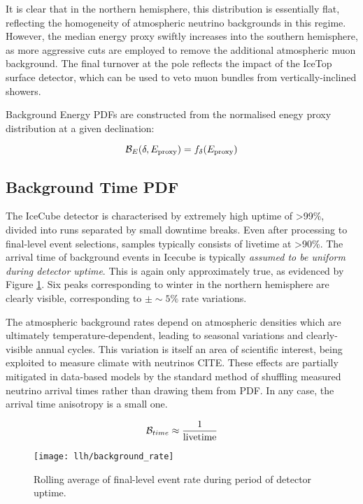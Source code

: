 It is clear that in the northern hemisphere, this distribution is essentially flat, reflecting the homogeneity of atmospheric neutrino backgrounds in this regime. However, the median energy proxy swiftly increases into the southern hemisphere, as more aggressive cuts are employed to remove the additional atmospheric muon background. The final turnover at the pole reflects the impact of the IceTop surface detector, which can be used to veto muon bundles from vertically-inclined showers. 

Background Energy PDFs are constructed from the normalised enegy proxy distribution at a given declination:

\begin{equation}
\mathcal{B}_{E} (\delta, E_{\textup{proxy}}) = f_{\delta}(E_{\textup{proxy}})
\label{eq:b_energy}
\end{equation}

\subsection{Background Time PDF}

The IceCube detector is characterised by extremely high uptime of >99\%, divided into runs separated by small downtime breaks. Even after processing to final-level event selections, samples typically consists of livetime at >90\%. The arrival time of background events in Icecube is typically \emph{assumed to be uniform during detector uptime}. This is again only approximately true, as evidenced by Figure \ref{fig:background_rate}.  Six peaks corresponding to winter in the northern hemisphere are clearly visible, corresponding to $\pm \sim5\%$ rate variations.

The atmospheric background rates depend on atmospheric densities which are ultimately temperature-dependent, leading to seasonal variations and clearly-visible annual cycles. This variation is itself an area of scientific interest, being exploited to measure climate with neutrinos CITE. These effects are partially mitigated in data-based models by the standard method of shuffling measured neutrino arrival times rather than drawing them from PDF. In any case, the arrival time anisotropy is a small one.

\begin{equation}
\mathcal{B}_{time} \approx \frac{1}{\textup{livetime}}
\end{equation}

\begin{figure}[!ht]
	\centering \texttt{[image: llh/background\_rate]}
	\caption{Rolling average of final-level event rate during period of detector uptime.}
	\label{fig:background_rate}
\end{figure}

